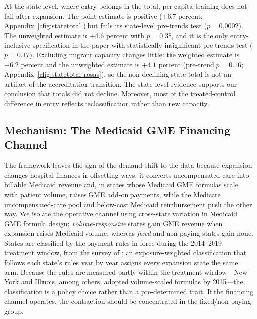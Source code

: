 At the state level, where entry belongs in the total, per-capita training does not fall after expansion. The point estimate is positive ($+6.7$ percent; Appendix~\cref{afig:statetotal}) but fails its state-level pre-trends test ($p = 0.0002$). The unweighted estimate is $+4.6$ percent with $p = 0.38$, and it is the only entry-inclusive specification in the paper with statistically insignificant pre-trends test ($p = 0.17$). Excluding migrant capacity changes little: the weighted estimate is $+6.2$ percent and the unweighted estimate is $+4.1$ percent (pre-trend $p = 0.16$; Appendix~\cref{afig:statetotal-nosas}), so the non-declining state total is not an artifact of the accreditation transition. The state-level evidence supports our conclusion that totals did not decline. Moreover, most of the treated-control difference in entry reflects reclassification rather than new capacity.

\subsection{Mechanism: The Medicaid GME Financing Channel}\label{subsec:mechanisms}

The framework leaves the sign of the demand shift to the data because expansion changes hospital finances in offsetting ways: it converts uncompensated care into billable Medicaid revenue and, in states whose Medicaid GME formulas scale with patient volume, raises GME add-on payments, while the Medicare uncompensated-care pool and below-cost Medicaid reimbursement push the other way. We isolate the operative channel using cross-state variation in Medicaid GME formula design: \emph{volume-responsive} states gain GME revenue when expansion raises Medicaid volume, whereas \emph{fixed} and non-paying states gain none. States are classified by the payment rules in force during the 2014--2019 treatment window, from the survey of \textcite{henderson2016}; an exposure-weighted classification that follows each state's rules year by year assigns every expansion state the same arm. Because the rules are measured partly within the treatment window---New York and Illinois, among others, adopted volume-scaled formulas by 2015---the classification is a policy choice rather than a pre-determined trait. If the financing channel operates, the contraction should be concentrated in the fixed/non-paying group.

